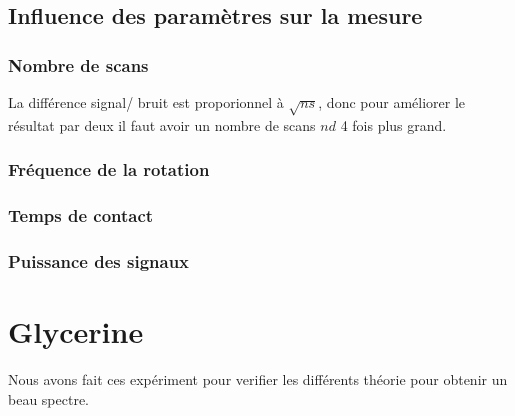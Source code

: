 \documentclass[a4paper,12pt]{scrartcl}
\begin{document}
   \subsection{Influence des paramètres sur la mesure}
    \subsubsection{Nombre de scans}
     La différence signal/ bruit est proporionnel à $\sqrt{ns}$, donc pour améliorer le résultat par deux il faut avoir un nombre de scans $nd$ 4 fois plus grand.

    \subsubsection{Fréquence de la rotation}

    \subsubsection{Temps de contact}

    \subsubsection{Puissance des signaux}

 \section{Glycerine}
  Nous avons fait ces expériment pour verifier les différents théorie pour obtenir un beau spectre.
\end{document}
